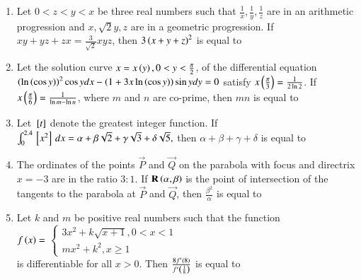 \documentclass[journal]{IEEEtran}
\begin{document}
\begin{enumerate}
\item Let $0<z<y<x$ be three real numbers such that $\frac{1}{x},\frac{1}{y}, \frac{1}{z}$ are in an arithmetic progression and $x,\sqrt{2}y, z$ are in a geometric progression. If $xy+yz+zx=\frac{3}{\sqrt{2}}xyz$, then $3\left(x+y+z\right)^2$ is equal to 

\item Let the solution curve $x=x\left(y\right), 0<y<\frac{\pi}{2}$, of the differential equation $\left(\ln\left(\cos y\right)\right)^2\cos y dx-\left(1+3x\ln \left(\cos y\right)\right)\sin y dy =0$ satisfy $x\left(\frac{\pi}{3}\right)=\frac{1}{2\ln 2}$. If $x\left(\frac{\pi}{6}\right)=\frac{1}{\ln m-\ln n}$, where $m$ and $n$ are co-prime, then $mn$ is equal to  

\item Let ${}\left[t\right]$ denote the greatest integer function. If $\int_{0}^{2.4} {}\left[x^2\right] \, dx
=\alpha+\beta\sqrt{2}+\gamma\sqrt{3}+\delta\sqrt{5},$ then $\alpha+\beta+\gamma+\delta$ is equal to

\item The ordinates of the points $\vec{P}$ and $\vec{Q}$ on the parabola with focus  and directrix $x=-3$ are in the ratio $3:1$. If $\mathbf{R}\left(\alpha,\beta\right)$ is the point of intersection of the tangents to the parabola at $\vec{P}$ and $\vec{Q}$, then $\frac{\beta^2}{\alpha}$ is equal to

\item Let $k$ and $m$ be positive real numbers such that the function \\$f\left(x\right)=$
$\begin{cases}
    3x^2+k\sqrt{x+1}, 0<x<1\\
    mx^2+k^2, x\geq 1 
\end{cases} $ \\is differentiable for all $x>0$. Then $\frac{8f^{\prime}\left(8\right)}{f^{\prime}\left(\frac{1}{8}\right)}$ is equal to
\end{enumerate}
\end{document}
